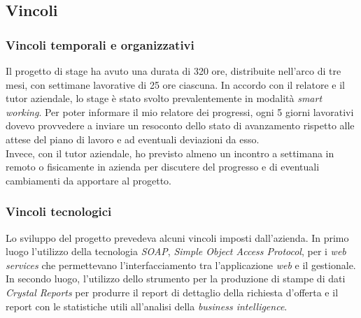 \subsection{Vincoli}
\subsubsection{Vincoli temporali e organizzativi}
Il progetto di stage ha avuto una durata di 320 ore, distribuite nell'arco di tre mesi, con settimane lavorative di 25 ore ciascuna.
In accordo con il relatore e il tutor aziendale, lo stage è stato svolto prevalentemente in modalità \textit{smart working}.
Per poter informare il mio relatore  dei progressi, ogni 5 giorni lavorativi dovevo provvedere a inviare un resoconto dello stato di avanzamento rispetto alle attese del piano di lavoro e ad eventuali deviazioni da esso.\\Invece, con il tutor aziendale, ho previsto almeno un incontro a settimana in remoto o fisicamente in azienda per discutere del progresso e di eventuali cambiamenti da apportare al progetto.
\subsubsection{Vincoli tecnologici}
Lo sviluppo del progetto prevedeva alcuni vincoli imposti dall'azienda.
In primo luogo l'utilizzo della tecnologia \textit{SOAP}, \textit{Simple Object Access Protocol}, per i \textit{web services} che permettevano l'interfacciamento tra l'applicazione \textit{web} e il gestionale.
In secondo luogo, l'utilizzo dello strumento per la produzione di stampe di dati \textit{Crystal Reports} per produrre il report di dettaglio della richiesta d'offerta e il report con le statistiche utili all'analisi della \textit{business intelligence}.
